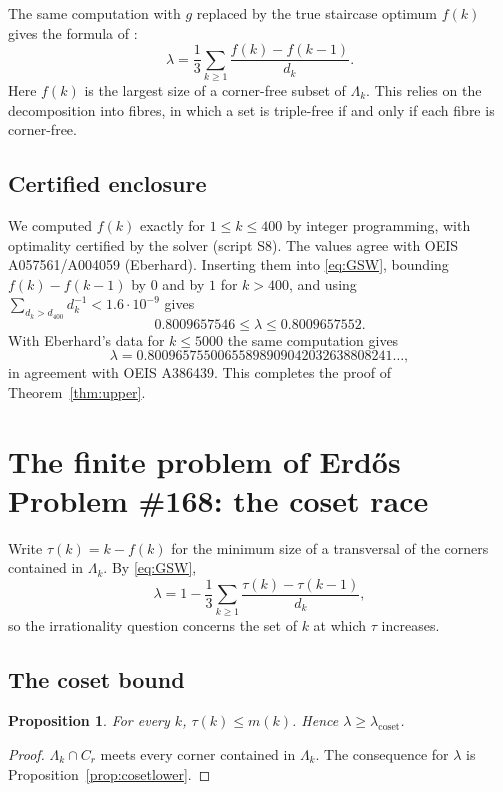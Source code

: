 \documentclass[11pt]{amsart}
\newtheorem{proposition}[theorem]{Proposition}
\theoremstyle{definition}
\newcommand{\lamc}{\lambda_{\mathrm{coset}}}
\begin{document}
The same computation with $g$ replaced by the true staircase optimum $f(k)$ gives the formula of \cite{GSW77}:
\begin{equation}\label{eq:GSW}
\lambda=\frac13\sum_{k\ge1}\frac{f(k)-f(k-1)}{d_k}.
\end{equation}
Here $f(k)$ is the largest size of a corner-free subset of $\Lambda_k$. This relies on the decomposition into fibres, in which a set is triple-free if and only if each fibre is corner-free.

\subsection{Certified enclosure}
We computed $f(k)$ exactly for $1\le k\le400$ by integer programming, with optimality certified by the solver (script S8). The values agree with OEIS A057561/A004059 (Eberhard). Inserting them into \eqref{eq:GSW}, bounding $f(k)-f(k-1)$ by $0$ and by $1$ for $k>400$, and using $\sum_{d_k>d_{400}}d_k^{-1}<1.6\cdot10^{-9}$ gives
\[
0.8009657546\le\lambda\le0.8009657552 .
\]
With Eberhard's data for $k\le5000$ the same computation gives\[\lambda=0.80096575500655898909042032638808241\ldots,\]in agreement with OEIS A386439. This completes the proof of Theorem~\ref{thm:upper}.

\section{The finite problem of Erd\H{o}s Problem \#168: the coset race}\label{sec:finite}

Write $\tau(k)=k-f(k)$ for the minimum size of a transversal of the corners contained in $\Lambda_k$. By \eqref{eq:GSW},
\begin{equation}\label{eq:lambda-tau}
\lambda=1-\frac13\sum_{k\ge1}\frac{\tau(k)-\tau(k-1)}{d_k},
\end{equation}
so the irrationality question concerns the set of $k$ at which $\tau$ increases.

\subsection{The coset bound}
\begin{proposition}\label{prop:cosetbound}
For every $k$, $\tau(k)\le m(k)$. Hence $\lambda\ge\lamc$.
\end{proposition}
\begin{proof}
$\Lambda_k\cap C_r$ meets every corner contained in $\Lambda_k$. The consequence for $\lambda$ is Proposition~\ref{prop:cosetlower}.
\end{proof}
\end{document}
